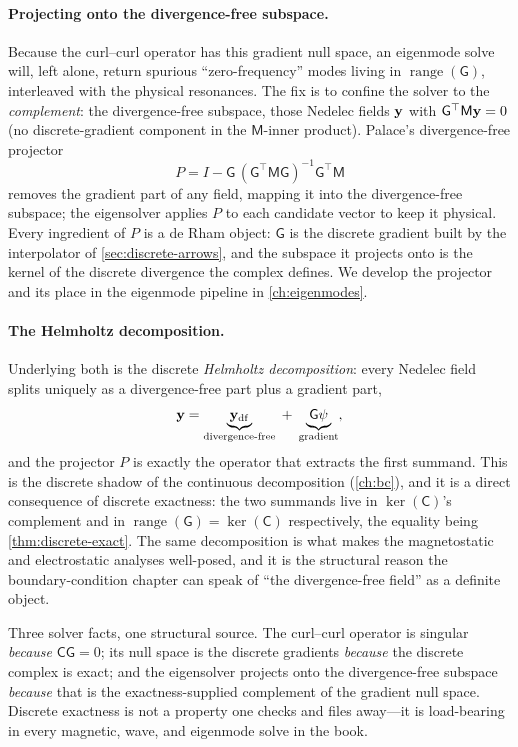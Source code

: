 \paragraph{Projecting onto the divergence-free subspace.} Because the curl--curl
operator has this gradient null space, an eigenmode solve will, left alone, return
spurious ``zero-frequency'' modes living in $\operatorname{range}(\mathsf{G})$,
interleaved with the physical resonances. The fix is to confine the solver to the
\emph{complement}: the divergence-free subspace, those Nedelec fields $\mathbf{y}$ with
$\mathsf{G}^\top\mathsf{M}\mathbf{y}=0$ (no discrete-gradient component in the $\mathsf{M}$-inner
product). Palace's divergence-free projector
\[
  P = I - \mathsf{G}\,(\mathsf{G}^\top\mathsf{M}\mathsf{G})^{-1}\mathsf{G}^\top\mathsf{M}
\]
removes the gradient part of any field, mapping it into the divergence-free subspace;
the eigensolver applies $P$ to each candidate vector to keep it physical. Every
ingredient of $P$ is a de Rham object: $\mathsf{G}$ is the discrete gradient built by
the interpolator of \cref{sec:discrete-arrows}, and the subspace it projects onto is
the kernel of the discrete divergence the complex defines. We develop the projector and
its place in the eigenmode pipeline in \cref{ch:eigenmodes}.

\paragraph{The Helmholtz decomposition.} Underlying both is the discrete
\emph{Helmholtz decomposition}: every Nedelec field splits uniquely as a
divergence-free part plus a gradient part,
\[
  \mathbf{y} = \underbrace{\mathbf{y}_{\mathrm{df}}}_{\text{divergence-free}}
        \;+\; \underbrace{\mathsf{G}\psi}_{\text{gradient}},
\]
and the projector $P$ is exactly the operator that extracts the first summand. This is
the discrete shadow of the continuous decomposition (\cref{ch:bc}), and it is a direct
consequence of discrete exactness: the two summands live in $\ker(\mathsf{C})$'s
complement and in $\operatorname{range}(\mathsf{G})=\ker(\mathsf{C})$ respectively, the
equality being \cref{thm:discrete-exact}. The same decomposition is what makes the
magnetostatic and electrostatic analyses well-posed, and it is the structural reason the
boundary-condition chapter can speak of ``the divergence-free field'' as a definite
object.

\begin{keyidea}
Three solver facts, one structural source. The curl--curl operator is singular
\emph{because} $\mathsf{C}\mathsf{G}=0$; its null space is the discrete gradients
\emph{because} the discrete complex is exact; and the eigensolver projects onto the
divergence-free subspace \emph{because} that is the exactness-supplied complement of
the gradient null space. Discrete exactness is not a property one checks and files
away---it is load-bearing in every magnetic, wave, and eigenmode solve in the book.
\end{keyidea}

